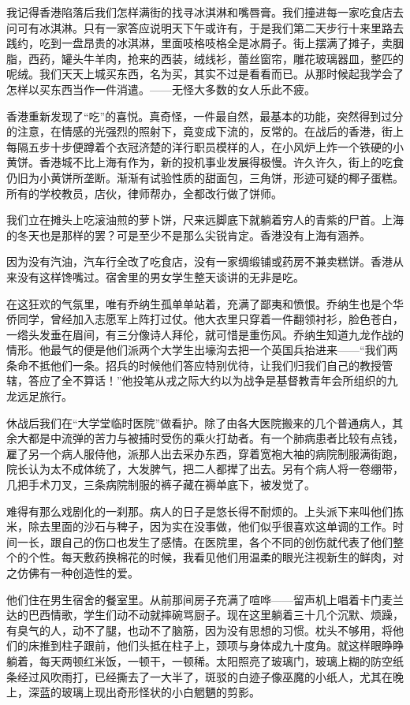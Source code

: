 \par 我记得香港陷落后我们怎样满街的找寻冰淇淋和嘴唇膏。我们撞进每一家吃食店去问可有冰淇淋。只有一家答应说明天下午或许有，于是我们第二天步行十来里路去践约，吃到一盘昂贵的冰淇淋，里面吱格吱格全是冰屑子。街上摆满了摊子，卖胭脂，西药，罐头牛羊肉，抢来的西装，绒线衫，蕾丝窗帘，雕花玻璃器皿，整匹的呢绒。我们天天上城买东西，名为买，其实不过是看看而已。从那时候起我学会了怎样以买东西当作一件消遣。——无怪大多数的女人乐此不疲。
\par 香港重新发现了“吃”的喜悦。真奇怪，一件最自然，最基本的功能，突然得到过分的注意，在情感的光强烈的照射下，竟变成下流的，反常的。在战后的香港，街上每隔五步十步便蹲着个衣冠济楚的洋行职员模样的人，在小风炉上炸一个铁硬的小黄饼。香港城不比上海有作为，新的投机事业发展得极慢。许久许久，街上的吃食仍旧为小黄饼所垄断。渐渐有试验性质的甜面包，三角饼，形迹可疑的椰子蛋糕。所有的学校教员，店伙，律师帮办，全都改行做了饼师。
\par 我们立在摊头上吃滚油煎的萝卜饼，尺来远脚底下就躺着穷人的青紫的尸首。上海的冬天也是那样的罢？可是至少不是那么尖锐肯定。香港没有上海有涵养。
\par 因为没有汽油，汽车行全改了吃食店，没有一家绸缎铺或药房不兼卖糕饼。香港从来没有这样馋嘴过。宿舍里的男女学生整天谈讲的无非是吃。
\par 在这狂欢的气氛里，唯有乔纳生孤单单站着，充满了鄙夷和愤恨。乔纳生也是个华侨同学，曾经加入志愿军上阵打过仗。他大衣里只穿着一件翻领衬衫，脸色苍白，一绺头发垂在眉间，有三分像诗人拜伦，就可惜是重伤风。乔纳生知道九龙作战的情形。他最气的便是他们派两个大学生出壕沟去把一个英国兵抬进来——“我们两条命不抵他们一条。招兵的时候他们答应特别优待，让我们归我们自己的教授管辖，答应了全不算话！”他投笔从戎之际大约以为战争是基督教青年会所组织的九龙远足旅行。
\par 休战后我们在“大学堂临时医院”做看护。除了由各大医院搬来的几个普通病人，其余大都是中流弹的苦力与被捕时受伤的乘火打劫者。有一个肺病患者比较有点钱，雇了另一个病人服侍他，派那人出去采办东西，穿着宽袍大袖的病院制服满街跑，院长认为太不成体统了，大发脾气，把二人都撵了出去。另有个病人将一卷绷带，几把手术刀叉，三条病院制服的裤子藏在褥单底下，被发觉了。
\par 难得有那么戏剧化的一刹那。病人的日子是悠长得不耐烦的。上头派下来叫他们拣米，除去里面的沙石与稗子，因为实在没事做，他们似乎很喜欢这单调的工作。时间一长，跟自己的伤口也发生了感情。在医院里，各个不同的创伤就代表了他们整个的个性。每天敷药换棉花的时候，我看见他们用温柔的眼光注视新生的鲜肉，对之仿佛有一种创造性的爱。
\par 他们住在男生宿舍的餐室里。从前那间房子充满了喧哗——留声机上唱着卡门麦兰达的巴西情歌，学生们动不动就摔碗骂厨子。现在这里躺着三十几个沉默、烦躁，有臭气的人，动不了腿，也动不了脑筋，因为没有思想的习惯。枕头不够用，将他们的床推到柱子跟前，他们头抵在柱子上，颈项与身体成九十度角。就这样眼睁睁躺着，每天两顿红米饭，一顿干，一顿稀。太阳照亮了玻璃门，玻璃上糊的防空纸条经过风吹雨打，已经撕去了一大半了，斑驳的白迹子像巫魔的小纸人，尤其在晚上，深蓝的玻璃上现出奇形怪状的小白魍魉的剪影。
